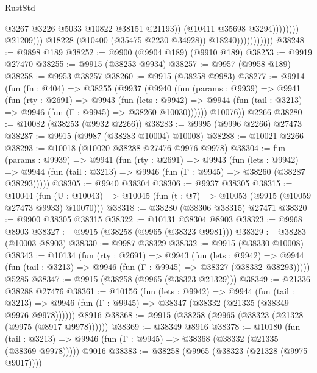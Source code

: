 \begin{lexlean}{RustStd}
\begin{coremodule}
                                                  @3267
                                                  @3226
                                                  @5033
                                                  @10822
                                                  @38151
                                                  @21193))
                                              (@10411 @35698 @3294))))))))
                                @21209)))
                          @18228
                          (@10400 (@35475 @2230 @34928))
                          @18240)))))))))))
@38248 := @9898 @189
@38252 := @9900 (@9904 @189) (@9910 @189)
@38253 := @9919 @27470
@38255 := @9915 (@38253 @9934)
@38257 := @9957 (@9958 @189)
@38258 := @9953 @38257
@38260 := @9915 (@38258 @9983)
@38277 := @9914
    (fun (fn : @404) =>
    @38255
      (@9937
        (@9940
          (fun (params : @9939) =>
          @9941
            (fun (rty : @2691) =>
            @9943
              (fun (lets : @9942) =>
              @9944 (fun (tail : @3213) => @9946 (fun (Γ : @9945) => @38260 @10030))))))
        @10076))
    @2266
@38280 := @10082 (@38253 (@9932 @2266))
@38283 := @9995 (@9996 @2266) @27473
@38287 := @9915 (@9987 (@38283 @10004) @10008)
@38288 := @10021 @2266
@38293 := @10018 (@10020 @38288 @27476 @9976 @9978)
@38304 := fun (params : @9939) =>
  @9941
    (fun (rty : @2691) =>
    @9943
      (fun (lets : @9942) =>
      @9944 (fun (tail : @3213) => @9946 (fun (Γ : @9945) => @38260 (@38287 @38293)))))
@38305 := @9940 @38304
@38306 := @9937 @38305
@38315 := @10044
    (fun (U : @10043) => @10045 (fun (t : @7) => @10053 (@9915 (@10059 @27473 @9933) @10070)))
@38318 := @38280 (@38306 @38315) @27471
@38320 := @9900 @38305 @38315
@38322 := @10131 @38304 @8903
@38323 := @9968 @8903
@38327 := @9915 (@38258 (@9965 (@38323 @9981)))
@38329 := @38283 (@10003 @8903)
@38330 := @9987 @38329
@38332 := @9915 (@38330 @10008)
@38343 := @10134
    (fun (rty : @2691) =>
    @9943
      (fun (lets : @9942) =>
      @9944 (fun (tail : @3213) => @9946 (fun (Γ : @9945) => @38327 (@38332 @38293)))))
    @5285
@38347 := @9915 (@38258 (@9965 (@38323 @21329)))
@38349 := @21336 @38288 @27476
@38361 := @10156
    (fun (lets : @9942) =>
    @9944
      (fun (tail : @3213) =>
      @9946 (fun (Γ : @9945) => @38347 (@38332 (@21335 (@38349 @9976 @9978))))))
    @8916
@38368 := @9915 (@38258 (@9965 (@38323 (@21328 (@9975 (@8917 @9978))))))
@38369 := @38349 @8916
@38378 := @10180
    (fun (tail : @3213) => @9946 (fun (Γ : @9945) => @38368 (@38332 (@21335 (@38369 @9978)))))
    @9016
@38383 := @38258 (@9965 (@38323 (@21328 (@9975 @9017))))

\end{coremodule}
\end{lexlean}
